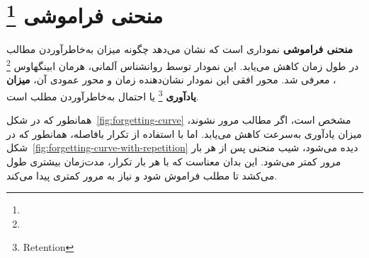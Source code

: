 \documentclass[12pt]{report}
\newtheorem{defn}[thm]{تعریف}
\begin{document}




\section{منحنی فراموشی \protect\footnote{}}
\textbf{منحنی فراموشی}
نموداری است که نشان می‌دهد چگونه میزان به‌خاطرآوردن 
مطالب در طول زمان کاهش می‌یابد.
 این نمودار توسط روانشناس آلمانی،
 هرمان ابینگهاوس
\footnote{}
 ، معرفی شد. محور 
افقی این نمودار نشان‌دهنده زمان و
 محور عمودی آن،
\textbf{میزان یادآوری}
\footnote{Retention} یا احتمال به‌خاطرآوردن مطلب است.

همانطور که در
شکل~\ref{fig:forgetting-curve}
مشخص است، اگر مطالب مرور نشوند،
 میزان یادآوری به‌سرعت کاهش می‌یابد.
 اما با استفاده از تکرار بافاصله،
 همانطور که در
شکل~\ref{fig:forgetting-curve-with-repetition}
 دیده می‌شود،
 شیب منحنی پس از هر بار مرور کمتر می‌شود.
 این بدان معناست که با هر بار تکرار،
 مدت‌زمان بیشتری طول می‌کشد تا مطلب فراموش شود
 و نیاز به مرور کمتری پیدا می‌کند.
 
\end{document}
